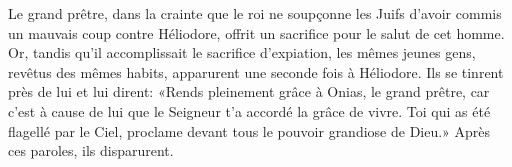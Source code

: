 Le grand prêtre, dans la crainte que le roi ne soupçonne les Juifs
		d’avoir commis un mauvais coup contre Héliodore,
	offrit un sacrifice pour le salut de cet homme.
Or, tandis qu’il accomplissait le sacrifice d’expiation,
	les mêmes jeunes gens, revêtus des mêmes habits,
	apparurent une seconde fois à Héliodore.
Ils se tinrent près de lui et lui dirent:
	«Rends pleinement grâce à Onias, le grand prêtre,
	car c’est à cause de lui que le Seigneur t’a accordé la grâce de vivre.
Toi qui as été flagellé par le Ciel,
	proclame devant tous le pouvoir grandiose de Dieu.»
Après ces paroles, ils disparurent.
